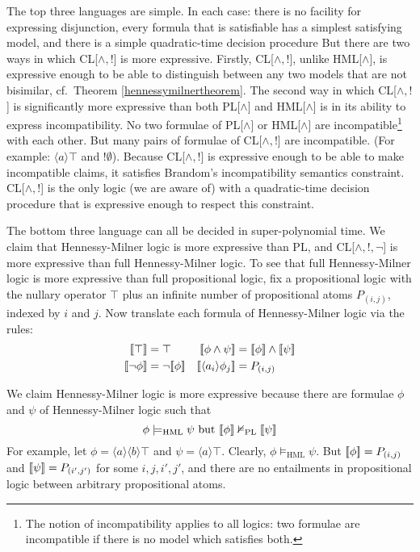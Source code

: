 \NI The top three languages are simple. In each case: there is no
facility for expressing disjunction, every formula that is satisfiable
has a simplest satisfying model, and there is a simple quadratic-time
decision procedure But there are two ways in which CL[$\land, !$] is
more expressive.  Firstly, CL[$\land, !$], unlike HML[$\land$], is expressive enough to be able to distinguish
between any two models that are not bisimilar, cf.~Theorem
\ref{hennessymilnertheorem}.  The second way in which
CL[$\land, !$] is significantly more expressive than both PL[$\land$]
and HML[$\land$] is in its ability to express incompatibility.  No two
formulae of PL[$\land$] or HML[$\land$] are incompatible\footnote{The notion of incompatibility applies to all logics: two formulae are incompatible if there is no model which satisfies both.} with each
other.  But many
pairs of formulae of CL[$\land, !$] are incompatible.  (For example:
$\langle a \rangle \top$ and $! \emptyset$).  Because CL[$\land, !$] is
expressive enough to be able to make incompatible claims, it satisfies
Brandom's incompatibility semantics constraint.
CL[$\land, !$] is the only logic (we are aware of) with a
quadratic-time decision procedure that is expressive enough to respect
this constraint. 

The bottom three language can all be decided in super-polynomial time.  We
claim that Hennessy-Milner logic is more expressive than PL, and CL[$\land, !, \neg$] is more expressive than full Hennessy-Milner logic.
To see that full Hennessy-Milner logic is more expressive than full
propositional logic, fix a propositional logic with the nullary
operator $\top$ plus an infinite number of propositional atoms
$P_{(i,j)}$, indexed by $i$ and $j$.  Now translate each formula of
Hennessy-Milner logic via the rules:
\begin{align*}
  \SEMB{\top}  & =  \top  &
  \SEMB{\phi \land \psi} & =  \SEMB{\phi} \land \SEMB{\psi}  \\
  \SEMB{\neg \phi} & =  \neg \SEMB{\phi}   &
  \SEMB{\langle a_i \rangle \phi_j} & =  P_{(i,j)} 
\end{align*}

\NI We claim Hennessy-Milner logic is more expressive because there
are formulae $\phi$ and $\psi$ of Hennessy-Milner logic such that
\[
\phi \models_{\text{{HML}}} \psi \mbox{ but } \lbrack\!\lbrack \phi \rbrack\!\rbrack \nvDash_{\text{PL}} \lbrack\!\lbrack \psi \rbrack\!\rbrack
\]
For example, let $\phi = \langle a \rangle \langle b \rangle \top$ and
$\psi = \langle a \rangle \top$.  Clearly, $\phi \models_{\text{HML}}
\psi$. But $\lbrack\!\lbrack \phi \rbrack\!\rbrack = P_{(i,j)}$ and $\lbrack\!\lbrack \psi \rbrack\!\rbrack = P_{(i',j')}$
for some $i,j,i',j'$, and there are no entailments in propositional
logic between arbitrary propositional atoms.

